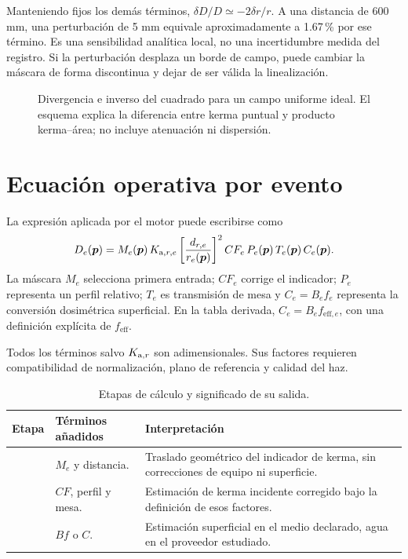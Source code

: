 Manteniendo fijos los demás términos, $\delta D/D\simeq-2\delta r/r$. A una distancia de 600 mm, una perturbación de 5 mm equivale aproximadamente a \num{1.67}\,\% por ese término. Es una sensibilidad analítica local, no una incertidumbre medida del registro. Si la perturbación desplaza un borde de campo, puede cambiar la máscara de forma discontinua y dejar de ser válida la linealización.



\begin{figure}[htbp]\centering
\caption{Divergencia e inverso del cuadrado para un campo uniforme ideal. El esquema explica la diferencia entre kerma puntual y producto kerma--área; no incluye atenuación ni dispersión.}\label{fig:distancia_pka}\end{figure}

\section{Ecuación operativa por evento}
La expresión aplicada por el motor puede escribirse como
\begin{equation}\label{eq:dose}
D_e(\bm{p})=M_e(\bm{p})\,K_{\mathrm{a},r,e}
\left[\frac{d_{r,e}}{r_e(\bm{p})}\right]^2
CF_e\,P_e(\bm{p})\,T_e(\bm{p})\,C_e(\bm{p}).
\end{equation}
La máscara $M_e$ selecciona primera entrada; $CF_e$ corrige el indicador; $P_e$ representa un perfil relativo; $T_e$ es transmisión de mesa y $C_e=B_e f_e$ representa la conversión dosimétrica superficial. En la tabla derivada, $C_e=B_e f_{\mathrm{eff},e}$, con una definición explícita de $f_{\mathrm{eff}}$.

Todos los términos salvo $K_{\mathrm{a},r}$ son adimensionales. Sus factores requieren compatibilidad de normalización, plano de referencia y calidad del haz. 

\begin{table}[htbp]\centering\small
\caption{Etapas de cálculo y significado de su salida.}
\begin{tabularx}{\textwidth}{p{32mm}YY}\toprule
Etapa & Términos añadidos & Interpretación\\\midrule
{} & $M_e$ y distancia. & Traslado geométrico del indicador de kerma, sin correcciones de equipo ni superficie.\\
 & $CF$, perfil y mesa. & Estimación de kerma incidente corregido bajo la definición de esos factores.\\
 & $Bf$ o $C$. & Estimación superficial en el medio declarado, agua en el proveedor estudiado.\\\bottomrule
\end{tabularx}
\end{table}

